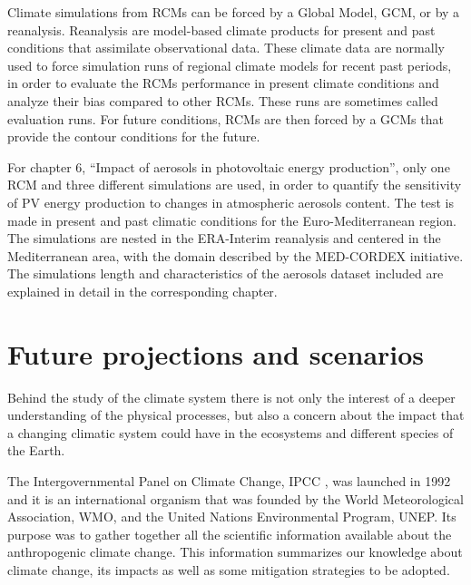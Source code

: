 Climate simulations from RCMs can be forced by a Global Model, GCM, or by a reanalysis. Reanalysis are model-based climate products for present and past conditions that assimilate observational data. These climate data are normally used to force simulation runs of regional climate models for recent past periods, in order to evaluate the RCMs performance in present climate conditions and analyze their bias compared to other RCMs. These runs are sometimes called evaluation runs. For future conditions, RCMs are then forced by a GCMs that provide the contour conditions for the future.  

For chapter 6, ``Impact of aerosols in photovoltaic energy production'', only one RCM and three different simulations are used, in order to quantify the sensitivity of PV energy production to changes in atmospheric aerosols content. The test is made in present and past climatic conditions for the Euro-Mediterranean region. The simulations are nested in the ERA-Interim reanalysis and centered in the Mediterranean area, with the domain described by the MED-CORDEX initiative. The simulations length and characteristics of the aerosols dataset included are explained in detail in the corresponding chapter.
 

\section{Future projections and scenarios}

Behind the study of the climate system there is not only the interest of a deeper understanding of the physical processes, but also a concern about the impact that a changing climatic system could have in the ecosystems and different species of the Earth.

The Intergovernmental Panel on Climate Change, IPCC \cite*{IPCC2013}, was launched in 1992 and it is an international organism that was founded by the World Meteorological Association, WMO, and the United Nations Environmental Program, UNEP. Its purpose was to gather together all the scientific information available about the anthropogenic climate change. This information summarizes our knowledge about climate change, its impacts as well as some mitigation strategies to be adopted.

